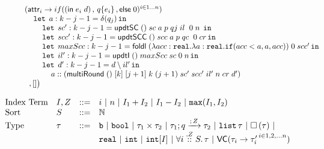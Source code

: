 \begin{figure}
\[\begin{array}{l}
 ( \mathsf{attr}_i \to if( (\mathsf{in}\; e_i \; d) \, , \, q\{e_i\} \,, \mathsf{else}\; 0)^{i \in 1\dots n} )\\
 \hspace{0.4cm} \mathop{\mathtt{let}} \; a: k - j - 1 = \delta (q_j)  \mathop{ \mathtt{in}} \\
 \hspace{0.8cm} \mathop{\mathtt{let}} \; sc': k - j - 1 =  \mathsf{updtSC} \; () \; sc  \; a \; p
                \; qj \; il \;  \; 0 \;  n \;  \mathop{ \mathtt{in}} \\
 \hspace{0.8cm} \mathop{\mathtt{let}} \; scc': k - j - 1 =  \mathsf{updtSCC} \; () \; scc \; a \; p
                \; qc \;  \; 0 \;  cr \mathop{ \mathtt{in}} \\
 \hspace{0.8cm} \mathop{\mathtt{let}} \; maxScc: k - j - 1 =  \mathsf{foldl} \; 
                (\lambda acc : \mathtt{real}. \lambda a: \mathtt{real}. 
                \mathtt{if} ( acc < a, a, acc)) \; 0 \; scc' \mathop{ \mathtt{in}} \\
 \hspace{0.8cm} \mathop{\mathtt{let}} \; il': k - j - 1 =  \mathsf{updtI}  \; () \; maxScc \; sc
                \; 0 \; n  \mathop{ \mathtt{in}} \\
 \hspace{0.8cm} \mathop{\mathtt{let}} \; d': k - j - 1 =  d \setminus il' \mathop{ \mathtt{in}} \\
 \hspace{1.2cm} a :: (\mathsf{multiRound} \; () \; [k] \; [j + 1]  
                 \; k \; (j+1) \; sc' \; scc' \; il'
                 \; n \; cr \; d')\\ 
 \hspace{0.2cm} , []  \big)
\end{array}
\]

\end{figure}

\clearpage
\[
\begin{array}{llll}
\mbox{Index Term} & I, Z & ::= &     i ~|~ n ~|~ I_1 + I_2 ~|~  I_1
                                 - I_2 ~|~ \mathtt{max}(I_1,I_2)\\
  \mbox{Sort} & S & ::= & \mathbb{N} \\
  \mbox{Type} & \tau & ::= & \mathtt{b} ~|~ \mathtt{bool} ~|~ \tau_1 \times
  \tau_2 ~|~ \tau_1; q \xrightarrow{; \, Z} \tau_2 ~|~
                              \mathtt{list} \, \tau ~|~ \mathtt{\square} \, (\tau) ~|~ \\
    & & & {   \mathtt{real} ~|~ \mathtt{int} ~|~   \mathtt{int}[I]  ~|~
          \forall i \overset{, Z}{::} S.\, \tau  } ~|~ \mathsf{VC}(\tau_i
          \to {\tau_i'}^{ \, i \in 1,2,\dots n} ) 
\end{array}
\]


